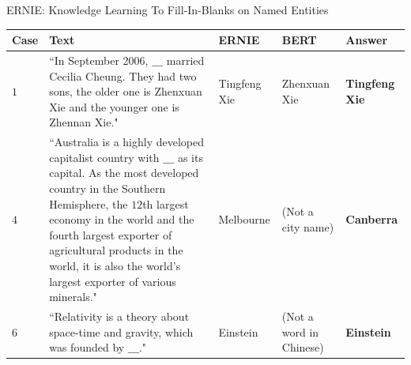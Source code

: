 \begin{frame}{ERNIE: Knowledge Learning To Fill-In-Blanks on Named Entities}

\vspace{10pt}

\begin{table}[htbp]
    \scriptsize 
    \centering \linespread{0.3}
    \setlength{\tabcolsep}{4pt} %
    \renewcommand{\arraystretch}{3} %
    
    \begin{tableFont}
    \begin{tabu} to \textwidth {| X[0.4] | X[6] | X | X | X |}
        
    
        \hline
      
        \centering \textbf{Case}
        & \centering \textbf{Text} 
        & \centering \textbf{ERNIE}
        & \centering\textbf{BERT} 
        & \centering \textbf{Answer} \\ 
        
        \hline
        
        
        $1$
        &
        ``In September 2006, $\_\_\_$ married Cecilia Cheung. They had two sons, the older one is Zhenxuan Xie and the younger one is Zhennan Xie." \newline
        & 
        Tingfeng Xie
        & 
        Zhenxuan Xie
        & 
        {\color{Green} \textbf{Tingfeng Xie}} \\ 
        
        \hline 
        
        
        
        $4$
        &
        ``Australia is a highly developed capitalist country with $\_\_\_$ as its capital. As the most developed country in the Southern Hemisphere, the $12$th largest economy in the world and the fourth largest exporter of agricultural products in the world, it is also the world's largest exporter of various minerals."   \newline 
        & 
        Melbourne
        & 
        (Not a city name)
        & 
        {\color{Green} \textbf{Canberra}} \\ 
        
        \hline 
        
        $6$
        &
        ``Relativity is a theory about space-time and gravity, which was founded by $\_\_\_$."   
        & 
        Einstein
        & 
        (Not a word in Chinese)
        & 
        {\color{Green} \textbf{Einstein}} \\ 
        

\end{tabu}
\end{tableFont}
\end{table}
\end{frame}
